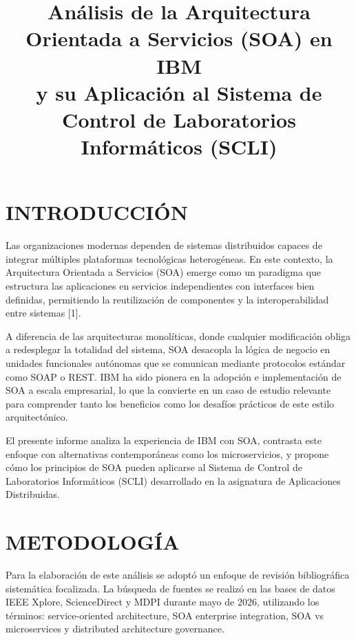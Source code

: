 \documentclass[conference]{IEEEtran}
\begin{document}
\title{Análisis de la Arquitectura Orientada a Servicios (SOA) en IBM\\
y su Aplicación al Sistema de Control de Laboratorios Informáticos (SCLI)}

\author{
}

\maketitle

\section{INTRODUCCIÓN}

Las organizaciones modernas dependen de sistemas distribuidos capaces de integrar múltiples plataformas tecnológicas heterogéneas. En este contexto, la Arquitectura Orientada a Servicios (SOA) emerge como un paradigma que estructura las aplicaciones en servicios independientes con interfaces bien definidas, permitiendo la reutilización de componentes y la interoperabilidad entre sistemas [1].

A diferencia de las arquitecturas monolíticas, donde cualquier modificación obliga a redesplegar la totalidad del sistema, SOA desacopla la lógica de negocio en unidades funcionales autónomas que se comunican mediante protocolos estándar como SOAP o REST. IBM ha sido pionera en la adopción e implementación de SOA a escala empresarial, lo que la convierte en un caso de estudio relevante para comprender tanto los beneficios como los desafíos prácticos de este estilo arquitectónico.

El presente informe analiza la experiencia de IBM con SOA, contrasta este enfoque con alternativas contemporáneas como los microservicios, y propone cómo los principios de SOA pueden aplicarse al Sistema de Control de Laboratorios Informáticos (SCLI) desarrollado en la asignatura de Aplicaciones Distribuidas.

\section{METODOLOGÍA}

Para la elaboración de este análisis se adoptó un enfoque de revisión bibliográfica sistemática focalizada. La búsqueda de fuentes se realizó en las bases de datos IEEE Xplore, ScienceDirect y MDPI durante mayo de 2026, utilizando los términos: service-oriented architecture, SOA enterprise integration, SOA vs microservices y distributed architecture governance.
\end{document}
